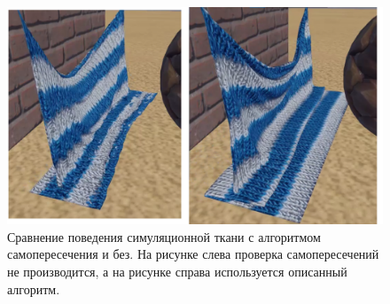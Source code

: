 		
	\begin{figure}[ht!] 
		\center
		\includegraphics [scale=0.4] {my_folder/images//selfCollisionOffOn}
		\caption{Сравнение поведения симуляционной ткани с алгоритмом самопересечения и без. На рисунке слева проверка самопересечений не производится, а на рисунке справа используется описанный алгоритм.}
		\label{fig:selfCollision}  
	\end{figure}	
	\FloatBarrier

%
